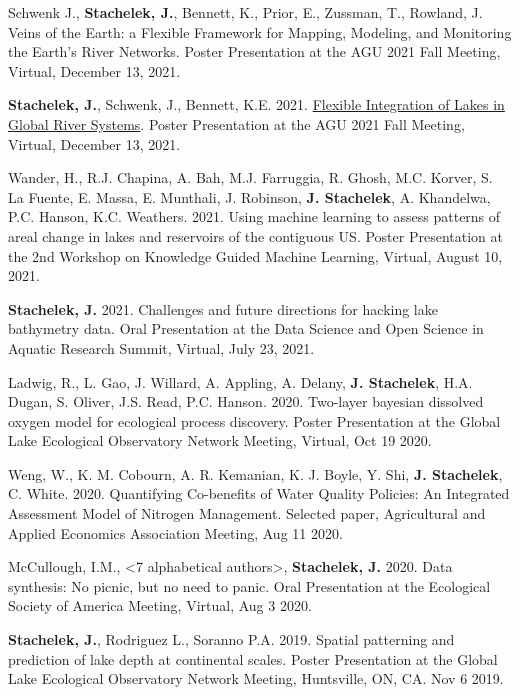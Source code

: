 \documentclass[11pt]{article}
\makeatletter
\newlength{\bibhang}
\newlength{\bibsep}
 {\@listi \global\bibsep\itemsep \global\advance\bibsep by\parsep}
\newenvironment{bibenum*}
  {\renewcommand\labelenumi{[\theenumi]}%
   \etaremune[
     topsep=0pt,
     itemsep=\bibsep,
     parsep=0pt,partopsep=0pt,
     itemindent=-\bibhang,
     leftmargin=0.8em
     ]
     }
  {\endetaremune}
\makeatother
\begin{document}
\begin{bibenum*}
    \item Schwenk J., \textbf{Stachelek, J.}, Bennett, K., Prior, E., Zussman, T., Rowland, J. Veins of the Earth: a Flexible Framework for Mapping, Modeling, and Monitoring the Earth's River Networks. Poster Presentation at the AGU 2021 Fall Meeting, Virtual, December 13, 2021.

    \item \textbf{Stachelek, J.}, Schwenk, J., Bennett, K.E. 2021. \href{https://doi.org/10.1002/essoar.10509383.1}{Flexible Integration of Lakes in Global River Systems}. Poster Presentation at the AGU 2021 Fall Meeting, Virtual, December 13, 2021.

    \item Wander, H., R.J. Chapina, A. Bah, M.J. Farruggia, R. Ghosh, M.C. Korver, S. La Fuente, E. Massa, E. Munthali, J. Robinson, \textbf{J. Stachelek}, A. Khandelwa, P.C. Hanson, K.C. Weathers. 2021. Using machine learning to assess patterns of areal change in lakes and reservoirs of the contiguous US. Poster Presentation at the 2nd Workshop on Knowledge Guided Machine Learning, Virtual, August 10, 2021.

    \item \textbf{Stachelek, J.} 2021. Challenges and future directions for hacking lake bathymetry data. Oral Presentation at the Data Science and Open Science in Aquatic Research Summit, Virtual, July 23, 2021.

    \item Ladwig, R., L. Gao, J. Willard, A. Appling, A. Delany, \textbf{J. Stachelek}, H.A. Dugan, S. Oliver, J.S. Read, P.C. Hanson. 2020. Two-layer bayesian dissolved oxygen model for ecological process discovery. Poster Presentation at the Global Lake Ecological Observatory Network Meeting, Virtual, Oct 19 2020.

    \item Weng, W., K. M. Cobourn, A. R. Kemanian, K. J. Boyle, Y. Shi, \textbf{J. Stachelek}, C. White. 2020. Quantifying Co-benefits of Water Quality Policies:  An Integrated Assessment Model of Nitrogen Management. Selected paper, Agricultural and Applied Economics Association Meeting, Aug 11 2020.

    \item McCullough, I.M., <7 alphabetical authors>, \textbf{Stachelek, J.} 2020. Data synthesis: No picnic, but no need to panic. Oral Presentation at the Ecological Society of America Meeting, Virtual, Aug 3 2020.

    \item \textbf{Stachelek, J.}, Rodriguez L., Soranno P.A. 2019. Spatial patterning and prediction of lake depth at continental scales. Poster Presentation at the Global Lake Ecological Observatory Network Meeting, Huntsville, ON, CA. Nov 6 2019.


\end{bibenum*}
\end{document}
